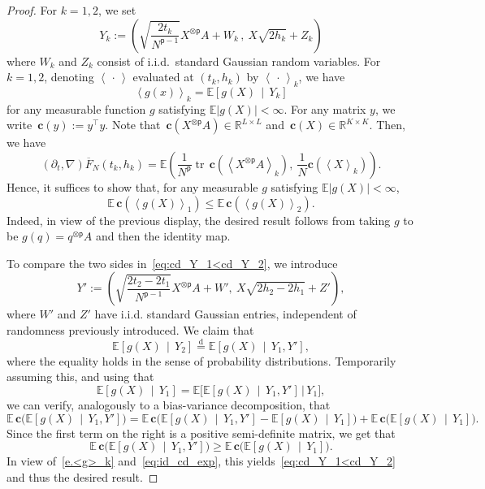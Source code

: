 \documentclass[AHL,Unicode,longabstracts,published]{cedram}
\newcommand{\R}{\mathbb{R}}
\newcommand{\E}{\mathbb{E}}
\newcommand{\bfc}{\mathbf{c}}
\DeclareMathOperator{\tr}{tr}
\renewcommand{\d}{\mathrm{d}}
\newcommand{\sfp}{\mathsf{p}}
\renewcommand{\leq}{\leqslant}
\renewcommand{\geq}{\geqslant}
\renewcommand{\bar}{\overline}
\newcommand{\la}{\left\langle}
\newcommand{\ra}{\right\rangle}
\begin{document}
\begin{proof}
For $k =1,2$, we set
\begin{equation*}
Y_k :=\left(\sqrt{\frac{2t_k}{N^{\sfp-1}}}X^{\otimes \sfp}A + W_k \,,\ X\sqrt{2h_k}+Z_k\right)
\end{equation*}
where $W_k$ and $Z_k$ consist of i.i.d.\ standard Gaussian random variables. For $k=1,2$, denoting $\la\,\cdot\,\ra$ evaluated at $(t_k,h_k)$ by $\la \,\cdot\,\ra_{k}$, we have
\begin{equation}\label{e.<g>_k}
\la g(x)\ra_{k} = \E\left[g(X)\,\middle|\,Y_k\right]
\end{equation}
for any measurable function $g$ satisfying $\E|g(X)|<\infty$. For any matrix $y$, we write $\,\bfc(y) := y^\intercal y$. Note that $\,\bfc(X^{\otimes \sfp}A) \in \R^{L\times L}$ and $\,\bfc(X) \in \R^{K\times K}$. Then, we have
\begin{equation*}
\left(\partial_t,\nabla\right)\bar F_N\left(t_k,h_k\right) = \E\left(\frac{1}{N^\sfp} \tr \,\bfc\left(\la X^{\otimes \sfp}A \ra_k\right),\ \frac{1}{N} \bfc\left(\la X\ra_k\right)\right).
\end{equation*}
Hence, it suffices to show that, for any measurable $g$ satisfying $\E|g(X)|<\infty$,
\begin{equation}\label{eq:cd_Y_1<cd_Y_2}
\E \,\bfc\left(\la g(X)\ra_1\right) \leq \E \,\bfc\left(\la g(X)\ra_2\right).
\end{equation}
Indeed, in view of the previous display, the desired result follows from taking $g$ to be $g(q) = q^{\otimes \sfp}A$ and then the identity map.

To compare the two sides in~\eqref{eq:cd_Y_1<cd_Y_2}, we introduce
\[
Y' := \left(\sqrt{\frac{2t_2-2t_1}{N^{\sfp-1}}}X^{\otimes \sfp}A + W',\ X\sqrt{2h_2-2h_1}+Z'\right),
\]
where $W'$ and $Z'$ have i.i.d. standard Gaussian entries, {independent of randomness previously introduced}. We claim that
\begin{equation}\label{eq:id_cd_exp}
\E\left[g(X)\,\middle|\,Y_2\right] \stackrel{\d}{=} \E\left[g(X)\,\middle|\,Y_1, Y'\right],
\end{equation}
where the equality holds in the sense of probability distributions. Temporarily assuming this, and using that
\[
\E\left[g(X)\,\middle|\, Y_1\right] = \E\big[\E \left[g(X)\,\middle|\, Y_1,Y'\right]\,\big|\,Y_1\big],
\]
we can verify, analogously to a bias-variance decomposition, that
\[
\E \,\bfc\big(\E\left[g(X)\,\middle|\, Y_1,Y'\right]\big) = \E \,\bfc\big(\E\left[g(X)\,\middle|\, Y_1,Y'\right]-\E\left[g(X)\,\middle|\, Y_1\right]\big)+\E \,\bfc\big(\E\left[g(X)\,\middle|\, Y_1\right]\big).
\]
Since the first term on the right is a positive semi-definite matrix, we get that
\[
\E \,\bfc\big(\E\left[g(X)\,\middle|\, Y_1,Y'\right]\big) \geq\E \,\bfc\big(\E\left[g(X)\,\middle|\, Y_1\right]\big).
\]
In view of~\eqref{e.<g>_k} and~\eqref{eq:id_cd_exp}, this yields~\eqref{eq:cd_Y_1<cd_Y_2} and thus the desired result.


\end{proof}
\end{document}
